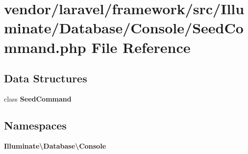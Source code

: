 \section{vendor/laravel/framework/src/\+Illuminate/\+Database/\+Console/\+Seed\+Command.php File Reference}
\label{_seed_command_8php}
\subsection*{Data Structures}
\begin{DoxyCompactItemize}
\item 
class {\bf Seed\+Command}
\end{DoxyCompactItemize}
\subsection*{Namespaces}
\begin{DoxyCompactItemize}
\item 
 {\bf Illuminate\textbackslash{}\+Database\textbackslash{}\+Console}
\end{DoxyCompactItemize}

